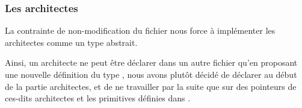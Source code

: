 
\subsubsection{Les architectes}
\label{builders}


La contrainte de non-modification du fichier  nous force à implémenter les architectes comme un type abstrait.

Ainsi, un architecte ne peut être déclarer dans un autre fichier qu'en proposant une nouvelle définition du type , nous avons plutôt décidé de déclarer au début de la partie  architectes, et de ne travailler par la suite que sur des pointeurs de ces-dits architectes et les primitives définies dans .



